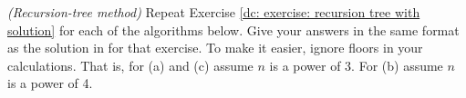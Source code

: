 \documentclass[11pt]{article}
\renewcommand{\inputAnswer}[1]{}
\begin{document}
\setlength{\ITEMHT}{0.95in}
{
\injectEnumerate 

\inputAnswer{problem_2_answer}
}




\newpage


\newcommand{\ALG}[4]{
  \vbox{                        %
    \begin{steps}
    \item[] def \textsf{Print{#1}s}$(n)$:  \comment{Assume $n$ is a power of $#4$.}
      \step for $i = 1$ to $#2$: print(``{#1}'') \comment{\ldots print $#2$ #1's}
      \step if $n > 1$:
      \step~~~for $j=1$ to $#3$: \textsf{Print{#1}s}$(\floor{n/#4})$
      \comment{\ldots make $#3$ recursive calls, each with input $\floor{n/#4}$}
    \end{steps}
  }
}

\newpage

\problem\label{problem: recursion}\emph{(Recursion-tree method)}
Repeat Exercise \ref{dc: exercise: recursion tree with solution} for each of the algorithms below.
Give your answers in the same format as the solution in  for that exercise.
To make it easier, ignore floors in your calculations.
That is, for (a) and (c) assume $n$ is a power of 3.
For (b) assume $n$ is a power of 4. 


\continued 

\setlength{\ITEMHT}{1.3in}
{
\injectEnumerate 

\inputAnswer{problem_3a_answer}

\continued 

\inputAnswer{problem_3b_answer}

\continued 

\inputAnswer{problem_3c_answer}
}
\end{document}
